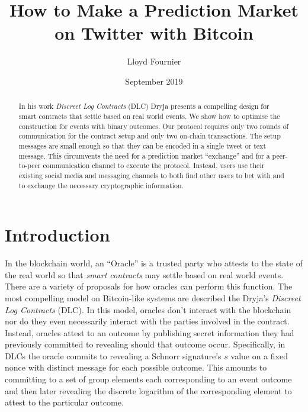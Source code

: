 \documentclass[runningheads]{llncs}
\begin{document}
\title{How to Make a Prediction Market on Twitter with Bitcoin}
\author{Lloyd Fournier}
\date{September 2019}

\maketitle

\begin{abstract}



In his work \emph{Discreet Log Contracts} (DLC) Dryja presents a compelling design for smart contracts that settle based on real world events. We show how to optimise the construction for events with binary outcomes. Our protocol requires only two rounds of communication for the contract setup and only two on-chain transactions. The setup messages are small enough so that they can be encoded in a single tweet or text message. This circumvents the need for a prediction market ``exchange'' and for a peer-to-peer communication channel to execute the protocol. Instead, users use their existing social media and messaging channels to both find other users to bet with and to exchange the necessary cryptographic information.
\end{abstract}

\section{Introduction}

In the blockchain world, an ``Oracle'' is a trusted party who attests to the state of the real world so that \emph{smart contracts} may settle based on real world events. There are a variety of proposals for how oracles can perform this function. The most compelling model on Bitcoin-like systems are described the Dryja's \textit{Discreet Log Contracts} (DLC)\cite{DLC}. In this model, oracles don't interact with the blockchain nor do they even necessarily interact with the parties involved in the contract. Instead, oracles attest to an outcome by publishing secret information they had previously committed to revealing should that outcome occur. Specifically, in DLCs the oracle commits to revealing a Schnorr signature's $s$ value on a fixed nonce with distinct message for each possible outcome. This amounts to committing to a set of group elements each corresponding to an event outcome and then later revealing the discrete logarithm of the corresponding element to attest to the particular outcome.
\end{document}
